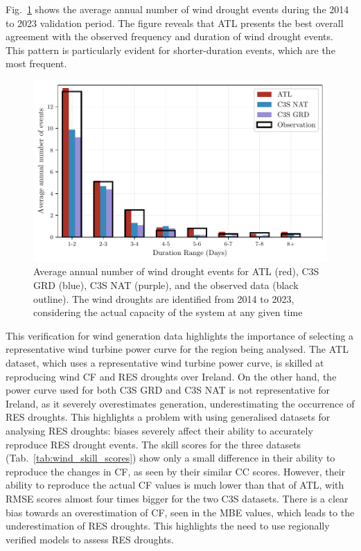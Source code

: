 \documentclass[preprint, 12pt]{elsarticle}
\begin{document}
Fig.~\ref{fig:bar_number_events_verification_wind} shows the average annual number of wind drought events during the 2014 to 2023 validation period. The figure reveals that ATL presents the best overall agreement with the observed frequency and duration of wind drought events. This pattern is particularly evident for shorter-duration events, which are the most frequent.

\begin{figure}[!ht]
	\centering
	\includegraphics[width=\textwidth]{verification_wind_number_events.pdf}
	\caption{Average annual number of wind drought events for ATL (red), C3S GRD (blue), C3S NAT (purple), and the observed data (black outline). The wind droughts are identified from 2014 to 2023, considering the actual capacity of the system at any given time}
	\label{fig:bar_number_events_verification_wind}
\end{figure}

This verification for wind generation data highlights the importance of selecting a representative wind turbine power curve for the region being analysed. The ATL dataset, which uses a representative wind turbine power curve, is skilled at reproducing wind CF and RES droughts over Ireland. On the other hand, the power curve used for both C3S GRD and C3S NAT is not representative for Ireland, as it severely overestimates generation, underestimating the occurrence of RES droughts. This highlights a problem with using generalised datasets for analysing RES droughts: biases severely affect their ability to accurately reproduce RES drought events. The skill scores for the three datasets (Tab.~\ref{tab:wind_skill_scores}) show only a small difference in their ability to reproduce the changes in CF, as seen by their similar CC scores. However, their ability to reproduce the actual CF values is much lower than that of ATL, with RMSE scores almost four times bigger for the two C3S datasets. There is a clear bias towards an overestimation of CF, seen in the MBE values, which leads to the underestimation of RES droughts. This highlights the need to use regionally verified models to assess RES droughts.
\end{document}

